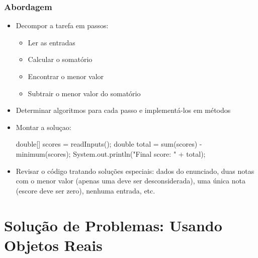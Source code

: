 \documentclass[xcolor={dvipsnames,table},aspectratio=169]{beamer}
\begin{document}
\begin{frame}[fragile]\frametitle{Abordagem}
\begin{itemize}
	\item Decompor a tarefa em passos:
	\begin{itemize}
		\item Ler as entradas
		\item Calcular o somatório
		\item Encontrar o menor valor
		\item Subtrair o menor valor do somatório
	\end{itemize}
	\item Determinar algoritmos para cada passo e implementá-los em métodos
	\item Montar a soluçao:
{\scriptsize
\begin{javacode}
double[] scores = readInputs();
double total = sum(scores) - minimum(scores);
System.out.println("Final score: " + total);
\end{javacode}
}
	\item Revisar o código tratando soluções especiais: dados do enunciado, duas notas com o menor valor (apenas uma deve ser desconsiderada), uma única nota (escore deve ser zero), nenhuma entrada, etc.
\end{itemize}
\end{frame}

\section{Solução de Problemas: Usando Objetos Reais}
\end{document}
